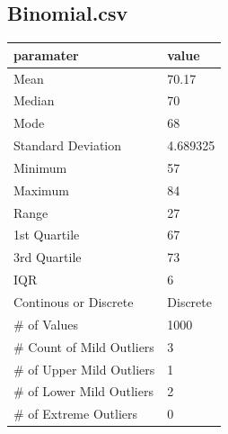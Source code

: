 \documentclass[10pt]{article}
\begin{document}
\subsection*{Binomial.csv}
\begin{table}[h!]
  \begin{center}
    \scriptsize
    \begin{tabular}{ll}
      \toprule
      paramater & value\\
      \midrule
 	Mean & 70.17\\
	Median & 70\\
	Mode & 68\\
	Standard Deviation & 4.689325\\
	Minimum & 57\\
	Maximum & 84\\
	Range & 27\\
	1st Quartile & 67\\
	3rd Quartile & 73\\
	IQR & 6\\
	Continous or Discrete & Discrete\\
	\# of Values & 1000\\ 
	\# Count of Mild Outliers & 3\\
	\# of Upper Mild Outliers & 1\\
	\# of Lower Mild Outliers & 2\\
	\# of Extreme Outliers & 0\\
       \bottomrule
    \end{tabular}
  \end{center}
\end{table}
\end{document}
